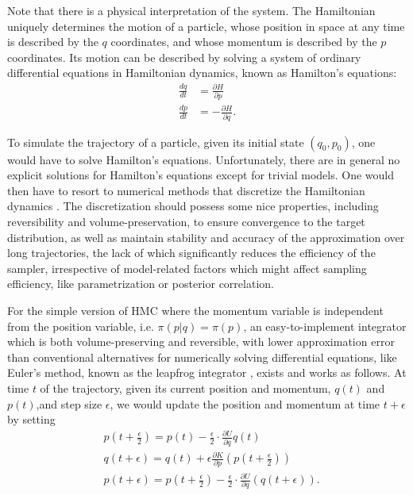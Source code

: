 \documentclass[12pt]{report}
\begin{document}
Note that there is a physical interpretation of the system. The Hamiltonian uniquely determines the motion of a particle, whose position in space at any time is described by the $q$ coordinates, and whose momentum is described by the $p$ coordinates. Its motion can be described by solving a system of ordinary differential equations in Hamiltonian dynamics, known as Hamilton's equations:
\begin{align*}
    \frac{dq}{dt} &= \frac{\partial H}{\partial p } \\
    \frac{dp}{dt} &= -\frac{\partial H}{\partial q}.
\end{align*}

To simulate the trajectory of a particle, given its initial state $(q_0,p_0)$, one
would have to solve Hamilton's equations. Unfortunately, there are in general no
explicit solutions for Hamilton's equations except for trivial models. One would
then have to resort to numerical methods that discretize the Hamiltonian
dynamics \cite{leimkuhler2004simulating}. The discretization should
possess some nice properties, including reversibility and volume-preservation, to ensure convergence to the target distribution, as well as maintain 
stability and accuracy of the approximation over long trajectories, the lack of which significantly reduces the efficiency of the sampler, irrespective of model-related factors which might affect sampling efficiency, like parametrization or posterior correlation.  

For the simple version of HMC where the momentum variable is independent from the position variable, i.e. $\pi(p|q)=\pi(p)$, an easy-to-implement integrator which is both volume-preserving and reversible, with lower approximation error than conventional alternatives for numerically solving differential equations, like Euler's method, known as the leapfrog integrator \cite{leimkuhler2004simulating}, exists and works as follows. At time $t$ of the trajectory, given its current position and momentum, $q(t)$ and $p(t)$,and step size $\epsilon$, we would update the position and momentum at time $t+\epsilon$ by setting 
\begin{align*}
    &p\left(t+\frac{\epsilon}{2}\right) = p(t) - \frac{\epsilon}{2}\cdot \frac{\partial
    U}{\partial
    q}q(t) \\
    &q(t+\epsilon) = q(t) + \epsilon  \frac{\partial K}{\partial p}\left(p\left(t+\frac{\epsilon}{2}\right)\right)
    \\
    &p(t+\epsilon) = p\left(t + \frac{\epsilon}{2}\right) - \frac{\epsilon} {2} \cdot \frac{\partial U}{\partial
    q}(q(t+\epsilon)).
\end{align*}
\end{document}
